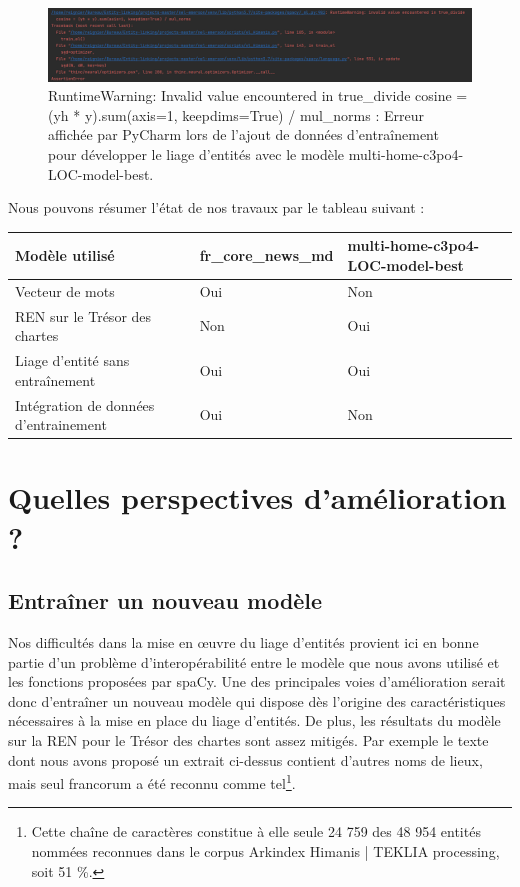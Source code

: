 \documentclass[a4paper,12pt,twoside]{book}
\begin{document}
	\begin{figure}
		\centering
		\includegraphics[width=\textwidth]{Images/Erreur_el.png}
		\caption{\og RuntimeWarning: Invalid value encountered in true\_divide cosine = (yh * y).sum(axis=1, keepdims=True) / mul\_norms\fg{} : Erreur affichée par PyCharm lors de l'ajout de données d'entraînement pour développer le liage d'entités avec le modèle \og multi-home-c3po4-LOC-model-best\fg{}.}
		\label{Erreur_el}
	\end{figure}
	
	\noindent Nous pouvons résumer l'état de nos travaux par le tableau suivant :
	
	\begin{center}
		\begin{tabular}{|p{7cm}|p{4cm}|p{4cm}|}
			\hline
			Modèle utilisé & fr\_core\_news\_md & multi-home-c3po4-LOC-model-best\\
			\hline
			Vecteur de mots & Oui & Non \\ \hline
			REN sur le Trésor des chartes & Non & Oui \\ \hline
			Liage d'entité sans entraînement & Oui & Oui \\ \hline
			Intégration de données d'entrainement & Oui & Non \\ \hline
		\end{tabular}
	\end{center}
	
	\section{Quelles perspectives d'amélioration ?}
	
	\subsection{Entraîner un nouveau modèle}
	
	Nos difficultés dans la mise en œuvre du liage d'entités provient ici en bonne partie d'un problème d'interopérabilité entre le modèle que nous avons utilisé et les fonctions proposées par spaCy. Une des principales voies d'amélioration serait donc d'entraîner un nouveau modèle qui dispose dès l'origine des caractéristiques nécessaires à la mise en place du liage d'entités. De plus, les résultats du modèle sur la REN pour le Trésor des chartes sont assez mitigés. Par exemple le texte dont nous avons proposé un extrait ci-dessus contient d'autres noms de lieux, mais seul \og francorum\fg{} a été reconnu comme tel\footnote{Cette chaîne de caractères constitue à elle seule 24 759 des 48 954 entités nommées reconnues dans le corpus Arkindex \og Himanis | TEKLIA processing\fg{}, soit 51 \%.}.
	
\end{document}
